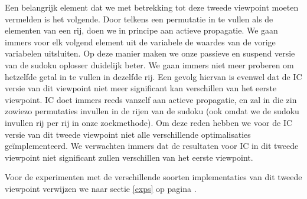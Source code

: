 \begin{description}
\begin{algorithm}
\end{algorithm}
Een belangrijk element dat we met betrekking tot deze tweede viewpoint moeten vermelden is het volgende.
Door telkens een permutatie in te vullen als de elementen van een rij, doen we in principe aan actieve propagatie.
We gaan immers voor elk volgend element uit de variabele de waardes van de vorige variabelen uitsluiten.
Op deze manier maken we onze passieve en suspend versie van de sudoku oplosser duidelijk beter. We gaan immers
niet meer proberen om hetzelfde getal in te vullen in dezelfde rij. Een gevolg hiervan is evenwel dat de IC
versie van dit viewpoint niet meer significant kan verschillen van het eerste viewpoint. IC doet immers reeds
vanzelf aan actieve propagatie, en zal in die zin zowiezo permutaties invullen in de rijen van de sudoku (ook omdat
we de sudoku invullen rij per rij in onze zoekmethode). Om deze reden
hebben we voor de IC versie van dit tweede viewpoint niet alle verschillende optimalisaties ge\"implementeerd. We 
verwachten immers dat de resultaten voor IC in dit tweede viewpoint niet significant zullen verschillen
van het eerste viewpoint. 

Voor de experimenten met de verschillende soorten implementaties van dit tweede viewpoint verwijzen we 
naar sectie \ref{exps} op pagina \pageref{exps}.
\end{description}

